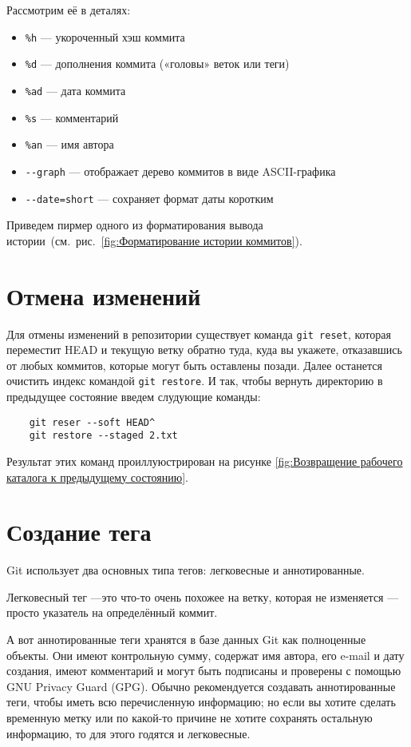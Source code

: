 Рассмотрим её в деталях:
\begin{itemize}
	\item \texttt{\%h} — укороченный хэш коммита
	\item \texttt{\%d} — дополнения коммита («головы» веток или теги)
	\item \texttt{\%ad} — дата коммита
	\item \texttt{\%s} — комментарий
	\item \texttt{\%an} — имя автора
	\item \verb|--graph| — отображает дерево коммитов в виде ASCII-графика
	\item \verb|--date=short| — сохраняет формат даты коротким
\end{itemize}

Приведем пирмер одного из форматирования вывода
истории~(см.~рис.~\ref{fig:Форматирование истории коммитов}).


\section{Отмена изменений}
Для отмены изменений в репозитории существует команда \texttt{git~reset},
которая переместит HEAD и текущую ветку обратно туда, куда вы укажете,
отказавшись от любых коммитов, которые могут быть оставлены позади.
Далее останется очистить индекс командой \texttt{git restore}.
И так, чтобы вернуть директорию в предыдущее состояние введем
слудующие команды:
\begin{verbatim}
	git reser --soft HEAD^
	git restore --staged 2.txt
\end{verbatim}
Результат этих команд проиллуюстрирован на рисунке \ref{fig:Возвращение рабочего каталога к предыдущему состоянию}.

\section{Создание тега}

Git использует два основных типа тегов: легковесные и аннотированные.

Легковесный тег ---это что-то очень похожее на ветку,
которая не изменяется --- просто указатель на определённый коммит.

А вот аннотированные теги хранятся в базе данных Git как полноценные объекты.
Они имеют контрольную сумму, содержат имя автора, его e-mail и дату создания,
имеют комментарий и могут быть подписаны и проверены с помощью
GNU Privacy Guard (GPG). Обычно рекомендуется создавать аннотированные теги,
чтобы иметь всю перечисленную информацию; но если вы хотите сделать
временную метку или по какой-то причине не хотите сохранять остальную
информацию, то для этого годятся и легковесные.

